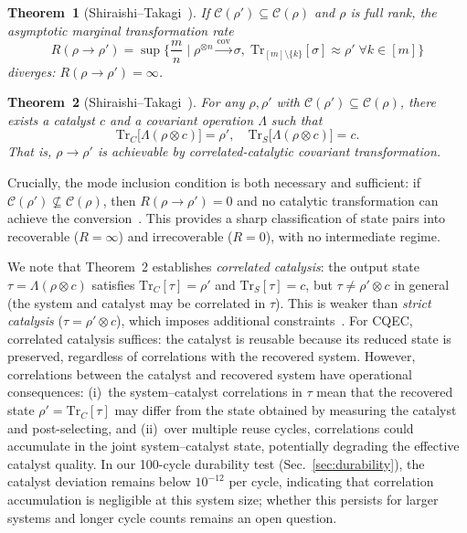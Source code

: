 \documentclass[prx,twocolumn,superscriptaddress,longbibliography,floatfix]{revtex4-2}
\begin{document}
\textbf{Theorem~1} (Shiraishi--Takagi~\cite{Shiraishi2024}).
\emph{If $\mathcal{C}(\rho') \subseteq \mathcal{C}(\rho)$ and $\rho$ is full rank, the asymptotic marginal transformation rate}
\begin{equation*}
R(\rho \to \rho') = \sup \biggl\{ \frac{m}{n} \;\bigg|\; \rho^{\otimes n} \xrightarrow{\mathrm{cov}} \sigma,\; \mathrm{Tr}_{[m]\setminus\{k\}}[\sigma] \approx \rho' \;\forall k \in [m] \biggr\}
\end{equation*}
\emph{diverges: $R(\rho \to \rho') = \infty$.}

\textbf{Theorem~2} (Shiraishi--Takagi~\cite{Shiraishi2024}).
\emph{For any $\rho, \rho'$ with $\mathcal{C}(\rho') \subseteq \mathcal{C}(\rho)$, there exists a catalyst $c$ and a covariant operation $\Lambda$ such that}
\begin{equation}
\mathrm{Tr}_C\bigl[\Lambda(\rho \otimes c)\bigr] = \rho', \quad \mathrm{Tr}_S\bigl[\Lambda(\rho \otimes c)\bigr] = c.
\label{eq:catalytic}
\end{equation}
\emph{That is, $\rho \to \rho'$ is achievable by correlated-catalytic covariant transformation.}

Crucially, the mode inclusion condition is both necessary and sufficient: if $\mathcal{C}(\rho') \not\subseteq \mathcal{C}(\rho)$, then $R(\rho \to \rho') = 0$ and no catalytic transformation can achieve the conversion~\cite{Shiraishi2024}.
This provides a sharp classification of state pairs into recoverable ($R = \infty$) and irrecoverable ($R = 0$), with no intermediate regime.

We note that Theorem~2 establishes \emph{correlated catalysis}: the output state $\tau = \Lambda(\rho \otimes c)$ satisfies $\mathrm{Tr}_C[\tau] = \rho'$ and $\mathrm{Tr}_S[\tau] = c$, but $\tau \neq \rho' \otimes c$ in general (the system and catalyst may be correlated in $\tau$).
This is weaker than \emph{strict catalysis} ($\tau = \rho' \otimes c$), which imposes additional constraints~\cite{Shiraishi2024}.
For CQEC, correlated catalysis suffices: the catalyst is reusable because its reduced state is preserved, regardless of correlations with the recovered system.
However, correlations between the catalyst and recovered system have operational consequences: (i)~the system--catalyst correlations in $\tau$ mean that the recovered state $\rho' = \mathrm{Tr}_C[\tau]$ may differ from the state obtained by measuring the catalyst and post-selecting, and (ii)~over multiple reuse cycles, correlations could accumulate in the joint system--catalyst state, potentially degrading the effective catalyst quality.
In our 100-cycle durability test (Sec.~\ref{sec:durability}), the catalyst deviation remains below $10^{-12}$ per cycle, indicating that correlation accumulation is negligible at this system size; whether this persists for larger systems and longer cycle counts remains an open question.
\end{document}
